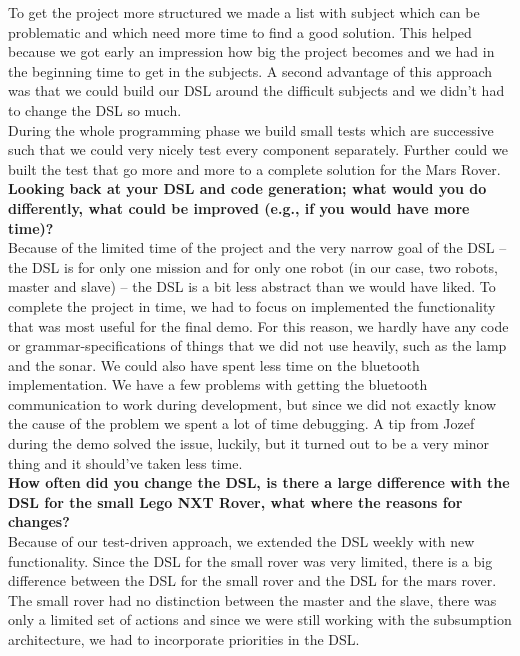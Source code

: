 \documentclass[11pt,a4paper]{article}
\begin{document}
To get the project more structured we made a list with subject which can be problematic and which need more time to find a good solution. This helped because we got early an impression how big the project becomes and we had in the beginning time to get in the subjects. A second advantage of this approach was that we could build our DSL around the difficult subjects and we didn't had to change the DSL so much. \\
During the whole programming phase we build small tests which are successive such that we could very nicely test every component separately. Further could we built the test that go more and more to a complete solution for the Mars Rover.\\

\textbf{Looking back at your DSL and code generation; what would you do differently, what could be improved (e.g., if you would have more time)?}\\
Because of the limited time of the project and the very narrow goal of the DSL -- the DSL is for only one mission and for only one robot (in our case, two robots, master and slave) -- the DSL is a bit less abstract than we would have liked. To complete the project in time, we had to focus on implemented the functionality that was most useful for the final demo. For this reason, we hardly have any code or grammar-specifications of things that we did not use heavily, such as the lamp and the sonar. 
We could also have spent less time on the bluetooth implementation. We have a few problems with getting the bluetooth communication to work during development, but since we did not exactly know the cause of the problem we spent a lot of time debugging. A tip from Jozef during the demo solved the issue, luckily, but it turned out to be a very minor thing and it should've taken less time.\\

\textbf{How often did you change the DSL, is there a large difference with the DSL for the small Lego NXT Rover, what where the reasons for changes?}\\
Because of our test-driven approach, we extended the DSL weekly with new functionality. Since the DSL for the small rover was very limited, there is a big difference between the DSL for the small rover and the DSL for the mars rover. The small rover had no distinction between the master and the slave, there was only a limited set of actions and since we were still working with the subsumption architecture, we had to incorporate priorities in the DSL.\\
\end{document}
